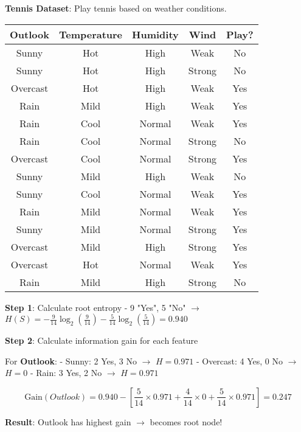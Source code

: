\documentclass{article}
\newcounter{example}
\begin{document}
\begin{tcolorbox}[colback=green!5!white,colframe=green!75!black,title=Example \stepcounter{example}\#\theexample: Building a Tree Step by Step]

\textbf{Tennis Dataset}: Play tennis based on weather conditions.

\begin{center}
\begin{tabular}{|c|c|c|c|c|}
\hline
\textbf{Outlook} & \textbf{Temperature} & \textbf{Humidity} & \textbf{Wind} & \textbf{Play?} \\
\hline
Sunny & Hot & High & Weak & No \\
Sunny & Hot & High & Strong & No \\
Overcast & Hot & High & Weak & Yes \\
Rain & Mild & High & Weak & Yes \\
Rain & Cool & Normal & Weak & Yes \\
Rain & Cool & Normal & Strong & No \\
Overcast & Cool & Normal & Strong & Yes \\
Sunny & Mild & High & Weak & No \\
Sunny & Cool & Normal & Weak & Yes \\
Rain & Mild & Normal & Weak & Yes \\
Sunny & Mild & Normal & Strong & Yes \\
Overcast & Mild & High & Strong & Yes \\
Overcast & Hot & Normal & Weak & Yes \\
Rain & Mild & High & Strong & No \\
\hline
\end{tabular}
\end{center}

\textbf{Step 1}: Calculate root entropy
- 9 "Yes", 5 "No" $\rightarrow$ $H(S) = -\frac{9}{14}\log_2(\frac{9}{14}) - \frac{5}{14}\log_2(\frac{5}{14}) = 0.940$

\textbf{Step 2}: Calculate information gain for each feature

For \textbf{Outlook}:
- Sunny: 2 Yes, 3 No $\rightarrow$ $H = 0.971$
- Overcast: 4 Yes, 0 No $\rightarrow$ $H = 0$  
- Rain: 3 Yes, 2 No $\rightarrow$ $H = 0.971$

$$\text{Gain}(Outlook) = 0.940 - [\frac{5}{14} \times 0.971 + \frac{4}{14} \times 0 + \frac{5}{14} \times 0.971] = 0.247$$

\textbf{Result}: Outlook has highest gain $\rightarrow$ becomes root node!
\end{tcolorbox}
\end{document}
